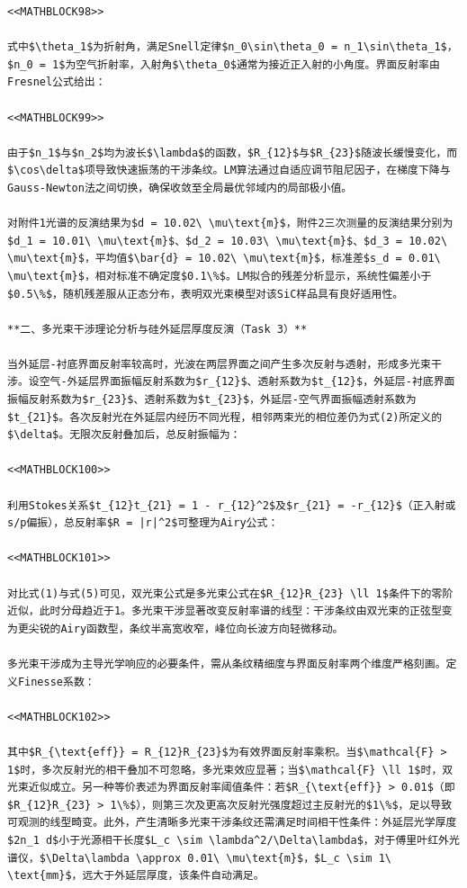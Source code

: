 \documentclass{mcmthesis}
\begin{document}
\begin{table}[htbp]
\begin{lstlisting}
<<MATHBLOCK98>>

式中$\theta_1$为折射角，满足Snell定律$n_0\sin\theta_0 = n_1\sin\theta_1$，$n_0 = 1$为空气折射率，入射角$\theta_0$通常为接近正入射的小角度。界面反射率由Fresnel公式给出：

<<MATHBLOCK99>>

由于$n_1$与$n_2$均为波长$\lambda$的函数，$R_{12}$与$R_{23}$随波长缓慢变化，而$\cos\delta$项导致快速振荡的干涉条纹。LM算法通过自适应调节阻尼因子，在梯度下降与Gauss-Newton法之间切换，确保收敛至全局最优邻域内的局部极小值。

对附件1光谱的反演结果为$d = 10.02\ \mu\text{m}$，附件2三次测量的反演结果分别为$d_1 = 10.01\ \mu\text{m}$、$d_2 = 10.03\ \mu\text{m}$、$d_3 = 10.02\ \mu\text{m}$，平均值$\bar{d} = 10.02\ \mu\text{m}$，标准差$s_d = 0.01\ \mu\text{m}$，相对标准不确定度$0.1\%$。LM拟合的残差分析显示，系统性偏差小于$0.5\%$，随机残差服从正态分布，表明双光束模型对该SiC样品具有良好适用性。

**二、多光束干涉理论分析与硅外延层厚度反演（Task 3）**

当外延层-衬底界面反射率较高时，光波在两层界面之间产生多次反射与透射，形成多光束干涉。设空气-外延层界面振幅反射系数为$r_{12}$、透射系数为$t_{12}$，外延层-衬底界面振幅反射系数为$r_{23}$、透射系数为$t_{23}$，外延层-空气界面振幅透射系数为$t_{21}$。各次反射光在外延层内经历不同光程，相邻两束光的相位差仍为式(2)所定义的$\delta$。无限次反射叠加后，总反射振幅为：

<<MATHBLOCK100>>

利用Stokes关系$t_{12}t_{21} = 1 - r_{12}^2$及$r_{21} = -r_{12}$（正入射或s/p偏振），总反射率$R = |r|^2$可整理为Airy公式：

<<MATHBLOCK101>>

对比式(1)与式(5)可见，双光束公式是多光束公式在$R_{12}R_{23} \ll 1$条件下的零阶近似，此时分母趋近于1。多光束干涉显著改变反射率谱的线型：干涉条纹由双光束的正弦型变为更尖锐的Airy函数型，条纹半高宽收窄，峰位向长波方向轻微移动。

多光束干涉成为主导光学响应的必要条件，需从条纹精细度与界面反射率两个维度严格刻画。定义Finesse系数：

<<MATHBLOCK102>>

其中$R_{\text{eff}} = R_{12}R_{23}$为有效界面反射率乘积。当$\mathcal{F} > 1$时，多次反射光的相干叠加不可忽略，多光束效应显著；当$\mathcal{F} \ll 1$时，双光束近似成立。另一种等价表述为界面反射率阈值条件：若$R_{\text{eff}} > 0.01$（即$R_{12}R_{23} > 1\%$），则第三次及更高次反射光强度超过主反射光的$1\%$，足以导致可观测的线型畸变。此外，产生清晰多光束干涉条纹还需满足时间相干性条件：外延层光学厚度$2n_1 d$小于光源相干长度$L_c \sim \lambda^2/\Delta\lambda$，对于傅里叶红外光谱仪，$\Delta\lambda \approx 0.01\ \mu\text{m}$，$L_c \sim 1\ \text{mm}$，远大于外延层厚度，该条件自动满足。


\end{lstlisting}
\end{table}
\end{document}
